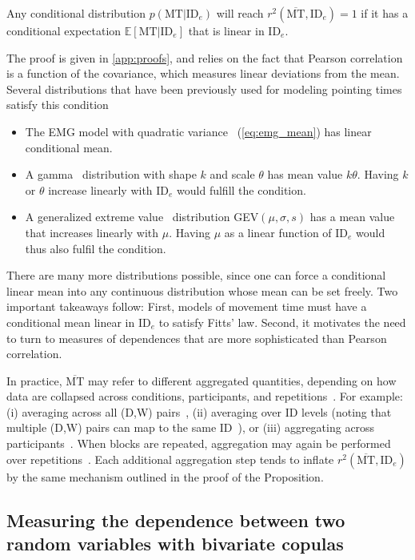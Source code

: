 \documentclass[acmlarge, manuscript,review]{acmart}
\newcommand{\mmt}{\ensuremath{\overline{\mt}}\xspace}
\newcommand{\mt}{\ensuremath{{\text{MT}}}\xspace}
\newcommand{\ide}{\ensuremath{{\text{ID}_e}}\xspace}
\begin{document}
\begin{proposition}\label{prop}
	Any conditional distribution $p(\mt|\ide)$ will reach $r^2(\mmt, \ide) = 1$ if it has a conditional expectation $\mathbb{E}[\mt|\ide]$ that is linear in \ide.
\end{proposition}

The proof is given in \autoref{app:proofs}, and relies on the fact that Pearson correlation is a function of the covariance, which measures linear deviations from the mean. Several distributions that have been previously used for modeling pointing times satisfy this condition
\begin{itemize}
	\item The EMG model with quadratic variance~\cite{gori2018these,gori2019, li2024,zhao2022} (\autoref{eq:emg_mean}) has linear conditional mean.
	\item A gamma~\cite{jude2016} distribution with shape $k$ and scale $\theta$ has mean value $k\theta$. Having $k$ or $\theta$ increase linearly with \ide would fulfill the condition.
	\item A generalized extreme value~\cite{chapuis2007} distribution GEV$(\mu, \sigma, s)$ has a mean value that increases linearly with $\mu$. Having $\mu$ as a linear function of \ide would thus also fulfil the condition.
\end{itemize}
There are many more distributions possible, since one can force a conditional linear mean into any continuous distribution whose mean can be set freely.
Two important takeaways follow: First, models of movement time must have a conditional mean linear in \ide to satisfy Fitts' law.
Second, it motivates the need to turn to measures of dependences that are more sophisticated than Pearson correlation.

In practice, \mmt may refer to different aggregated quantities, depending on how data are collapsed across conditions, participants, and repetitions~\cite{olafsdottir2012}. For example: (i) averaging across all (D,W) pairs~\cite{soukoreff2004}, (ii) averaging over ID levels (noting that multiple (D,W) pairs can map to the same ID~\cite{gori2018chi}), or (iii) aggregating across participants~\cite{accot1997,mackenzie2008}. When blocks are repeated, aggregation may again be performed over repetitions~\cite{jude2016,guiard2011}. Each additional aggregation step tends to inflate 
$r^2(\mmt,\ide)$ by the same mechanism outlined in the proof of the Proposition.


\subsection{Measuring the dependence between two random variables with bivariate copulas\label{sec:copula}}
\end{document}
